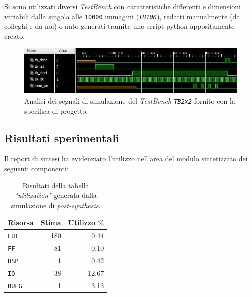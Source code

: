 \documentclass{article}
\begin{document}
Si sono utilizzati diversi \emph{TestBench} con caratteristiche differenti e dimensioni variabili dalla singola alle \texttt{10000} immagini (\emph{\texttt{TB10K}}), redatti manualmente (da colleghi e da noi) o auto-generati tramite uno script python appositamente creato.
\vspace{0,2cm}

\begin{figure}[ht]
    \centering
    \includegraphics[scale=0.8]{2x2.jpg}
    \caption{Analisi dei segnali di simulazione del \emph{TestBench \texttt{TB2x2}} fornito con la specifica di progetto.}
\end{figure}
\vspace{0,2cm}

\clearpage
\pagebreak

\subsection{Risultati sperimentali}
Il report di sintesi ha evidenziato l’utilizzo nell’area del modulo sintetizzato dei seguenti componenti:

\begin{table}[ht]
    \centering
    \small
    \def\arraystretch{1.3} %
    \caption{Risultati della tabella \emph{"utilization"} generata dalla simulazione di \emph{post-synthesis}.}
    \begin{tabular}[width=4cm]{|| l | r | r ||}
        \hline
        Risorsa       & Stima & Utilizzo $\%$\footnotemark \\
        \hline \hline
        \texttt{LUT}  & 180   & 0.44                       \\ \hline
        \texttt{FF}   & 81    & 0.10                       \\ \hline
        \texttt{DSP}  & 1     & 0.42                       \\ \hline
        \texttt{IO}   & 38    & 12.67                      \\ \hline
        \texttt{BUFG} & 1     & 3.13                       \\ \hline
    \end{tabular}
\end{table}
\vspace{0,2cm}
\end{document}
